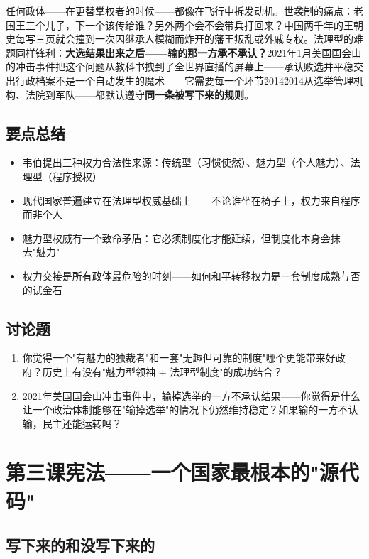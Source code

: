 \documentclass[a4paper,12pt]{ctexart}
\begin{document}
任何政体——在更替掌权者的时候——都像在飞行中拆发动机。世袭制的痛点：老国王三个儿子，下一个该传给谁？另外两个会不会带兵打回来？中国两千年的王朝史每写三页就会撞到一次因继承人模糊而炸开的藩王叛乱或外戚专权。法理型的难题同样锋利：\textbf{大选结果出来之后——输的那一方承不承认？}2021年1月美国国会山的冲击事件把这个问题从教科书拽到了全世界直播的屏幕上——承认败选并平稳交出行政档案不是一个自动发生的魔术——它需要每一个环节\u2014\u2014从选举管理机构、法院到军队——都默认遵守\textbf{同一条被写下来的规则}。

\subsection*{要点总结}
\begin{itemize}
  \item 韦伯提出三种权力合法性来源：传统型（习惯使然）、魅力型（个人魅力）、法理型（程序授权）
  \item 现代国家普遍建立在法理型权威基础上——不论谁坐在椅子上，权力来自程序而非个人
  \item 魅力型权威有一个致命矛盾：它必须制度化才能延续，但制度化本身会抹去"魅力"
  \item 权力交接是所有政体最危险的时刻——如何和平转移权力是一套制度成熟与否的试金石
\end{itemize}

\subsection*{讨论题}
\begin{enumerate}
  \item 你觉得一个"有魅力的独裁者"和一套"无趣但可靠的制度"哪个更能带来好政府？历史上有没有"魅力型领袖 + 法理型制度"的成功结合？
  \item 2021年美国国会山冲击事件中，输掉选举的一方不承认结果——你觉得是什么让一个政治体制能够在"输掉选举"的情况下仍然维持稳定？如果输的一方不认输，民主还能运转吗？
\end{enumerate}

\newpage
\section{\textcolor{orange!80!black}{第三课\quad 宪法——一个国家最根本的"源代码"}}

\subsection*{写下来的和没写下来的}
\end{document}
